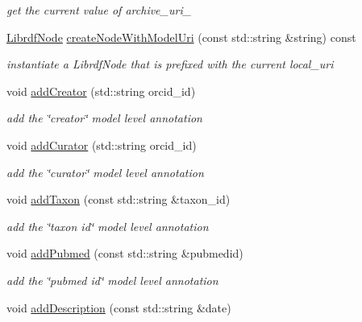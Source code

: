 \begin{DoxyCompactItemize}
\begin{DoxyCompactList}\small\item\em get the current value of archive\+\_\+uri\+\_\+ \end{DoxyCompactList}\item 
\mbox{\label{classomexmeta_1_1Editor_a5143e1f8db82393faed322810acf5e92}} 
\hyperlink{classredland_1_1LibrdfNode}{Librdf\+Node} \hyperlink{classomexmeta_1_1Editor_a5143e1f8db82393faed322810acf5e92}{create\+Node\+With\+Model\+Uri} (const std\+::string \&string) const
\begin{DoxyCompactList}\small\item\em instantiate a Librdf\+Node that is prefixed with the current local\+\_\+uri \end{DoxyCompactList}\item 
void \hyperlink{classomexmeta_1_1Editor_a9c8b060005146f3cf5a231ea6789e7d7}{add\+Creator} (std\+::string orcid\+\_\+id)
\begin{DoxyCompactList}\small\item\em add the \char`\"{}creator\char`\"{} model level annotation \end{DoxyCompactList}\item 
void \hyperlink{classomexmeta_1_1Editor_a8b83488faf68546733114acf54595b02}{add\+Curator} (std\+::string orcid\+\_\+id)
\begin{DoxyCompactList}\small\item\em add the \char`\"{}curator\char`\"{} model level annotation \end{DoxyCompactList}\item 
void \hyperlink{classomexmeta_1_1Editor_af64f0cac6b7e27b121df94ab5b1fa217}{add\+Taxon} (const std\+::string \&taxon\+\_\+id)
\begin{DoxyCompactList}\small\item\em add the \char`\"{}taxon id\char`\"{} model level annotation \end{DoxyCompactList}\item 
void \hyperlink{classomexmeta_1_1Editor_a533f93c8ae0c3081dfe2fc8e8ebee8ea}{add\+Pubmed} (const std\+::string \&pubmedid)
\begin{DoxyCompactList}\small\item\em add the \char`\"{}pubmed id\char`\"{} model level annotation \end{DoxyCompactList}\item 
void \hyperlink{classomexmeta_1_1Editor_a8526a87544b1265695f1749100da5fa2}{add\+Description} (const std\+::string \&date)

\end{DoxyCompactItemize}
